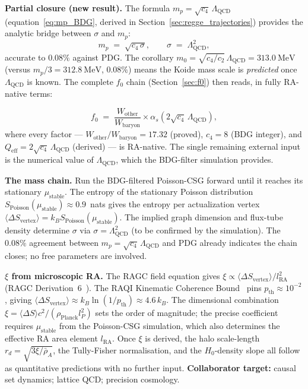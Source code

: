 \documentclass[11pt,a4paper]{article}
\begin{document}
\textbf{Partial closure (new result).}
The formula $m_p = \sqrt{c_4}\,\Lambda_{\mathrm{QCD}}$ (equation~\eqref{eq:mp_BDG},
derived in Section~\ref{sec:regge_trajectories}) provides the analytic bridge
between $\sigma$ and $m_p$:
\begin{equation}
  m_p \;=\; \sqrt{c_4\,\sigma}, \qquad
  \sigma \;=\; \Lambda_{\mathrm{QCD}}^2,
  \label{eq:mp_sigma}
\end{equation}
accurate to $0.08\%$ against PDG.  The corollary
$m_0 = \sqrt{c_4/c_2}\,\Lambda_{\mathrm{QCD}} = 313.0~\mathrm{MeV}$ (versus
$m_p/3 = 312.8~\mathrm{MeV}$, $0.08\%$) means the Koide mass scale is
\emph{predicted} once $\Lambda_{\mathrm{QCD}}$ is known.  The complete
$f_0$ chain (Section~\ref{sec:f0}) then reads, in fully RA-native terms:

\begin{equation}
  f_0 \;=\; \frac{W_{\mathrm{other}}}{W_{\mathrm{baryon}}}
  \times\alpha_s\!\left(2\sqrt{c_4}\,\Lambda_{\mathrm{QCD}}\right),
  \label{eq:f0_native}
\end{equation}
where every factor — $W_{\mathrm{other}}/W_{\mathrm{baryon}} = 17.32$
(proved), $c_4=8$ (BDG integer), and $Q_{\mathrm{eff}} = 2\sqrt{c_4}\,
\Lambda_{\mathrm{QCD}}$ (derived) — is RA-native.  The single remaining
external input is the numerical value of $\Lambda_{\mathrm{QCD}}$, which
the BDG-filter simulation provides.

\textbf{The mass chain.}
Run the BDG-filtered Poisson-CSG forward until it reaches its stationary
$\mu_{\mathrm{stable}}$. The entropy of the stationary Poisson distribution
$S_{\mathrm{Poisson}}(\mu_{\mathrm{stable}}) \approx 0.9$~nats gives the
entropy per actualization vertex $\langle\Delta S_{\mathrm{vertex}}\rangle
= k_B S_{\mathrm{Poisson}}(\mu_{\mathrm{stable}})$.
The implied graph dimension and flux-tube density determine $\sigma$ via
$\sigma = \Lambda_{\mathrm{QCD}}^2$ (to be confirmed by the simulation).
The $0.08\%$ agreement between $m_p = \sqrt{c_4}\,\Lambda_{\mathrm{QCD}}$
and PDG already indicates the chain closes; no free parameters are involved.

\textbf{$\xi$ from microscopic RA.}
The RAGC field equation gives
$\xi \propto \langle\Delta S_{\mathrm{vertex}}\rangle / l_{\mathrm{RA}}^2$
(RAGC Derivation~6~\citep{Sandeman2026RAGC}).
The RAQI Kinematic Coherence Bound~\citep{Sandeman2026RAQI} pins
$p_{\mathrm{th}} \approx 10^{-2}$, giving
$\langle\Delta S_{\mathrm{vertex}}\rangle \approx k_B \ln(1/p_{\mathrm{th}})
\approx 4.6\,k_B$.
The dimensional combination $\xi = \langle\Delta S\rangle c^2 /
(\rho_{\mathrm{Planck}} l_P^2)$ sets the order of magnitude; the precise
coefficient requires $\mu_{\mathrm{stable}}$ from the Poisson-CSG simulation,
which also determines the effective RA area element $l_{\mathrm{RA}}$.
Once $\xi$ is derived, the halo scale-length $r_d = \sqrt{3\xi/\bar\rho_A}$,
the Tully-Fisher normalisation, and the $H_0$-density slope all follow as
quantitative predictions with no further input.
\textbf{Collaborator target:} causal set dynamics; lattice QCD; precision cosmology.
\end{document}
